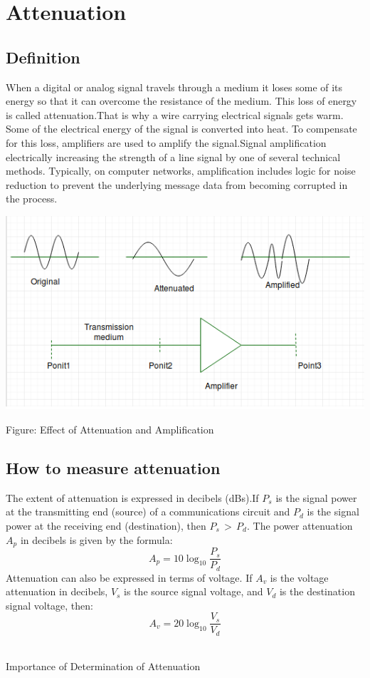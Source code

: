 \documentclass[12pt,a4paper]{article}%
\begin{document}
	\pagebreak
	\section{Attenuation}
	\begin{flushleft}
		
		\subsection{Definition} 
		\begin{flushleft}
			When a digital or analog signal travels through a medium it loses some of its energy so that it can overcome the resistance of the medium. This loss of energy is called attenuation.That is why a wire carrying electrical signals gets warm. Some of the electrical energy of the signal is converted into heat. To compensate for this loss, amplifiers are used to amplify the signal.Signal amplification electrically increasing the strength of a line signal by one of several technical methods. Typically, on computer networks, amplification includes logic for noise reduction to prevent the underlying message data from becoming corrupted in the process.
			
		\end{flushleft}
		
		\begin{center}
			\includegraphics[width=0.80 \textwidth]{./images/NKK1.png}
		\end{center}
		\begin{center}
			Figure: Effect of Attenuation and Amplification
		\end{center}
		
		\subsection{How to measure attenuation} 
		\begin{flushleft}
			The extent of attenuation is expressed in decibels (dBs).If $P_s$ is the signal power at the transmitting end (source) of a communications circuit and $P_d$ is the signal power at the receiving end (destination), then $P_s\, >\, P_d$. The power attenuation $A_p$ in decibels is given by the formula:
			$$A_p= 10\log_{10}{\frac{P_s}{P_d}}$$
			Attenuation can also be expressed in terms of voltage. If $A_v$ is the voltage attenuation in decibels, $V_s$ is the source signal voltage, and $V_d$ is the destination signal voltage, then:$$A_v= 20\log_{10}{\frac{V_s}{V_d}}$$\\\bigskip
			\item Importance of Determination of Attenuation

\end{flushleft}
\end{flushleft}
\end{document}

